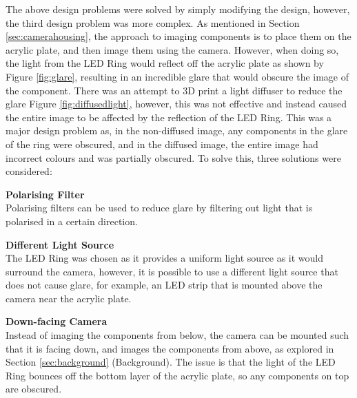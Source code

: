 The above design problems were solved by simply modifying the design, however, the third design problem was more complex. As mentioned in Section \ref{sec:camerahousing}, the approach 
to imaging components is to place them on the acrylic plate, and then image them using the camera. However, when doing so, the light from the LED Ring would reflect off the acrylic plate as shown by Figure \ref{fig:glare},
resulting in an incredible glare that would obscure the image of the component. There was an attempt to 3D print a light diffuser to reduce the glare Figure \ref{fig:diffusedlight}, however, this was not effective and instead
caused the entire image to be affected by the reflection of the LED Ring. This was a major design problem as, in the non-diffused image, any components in the glare of the ring were obscured, and in the diffused image,
the entire image had incorrect colours and was partially obscured. To solve this, three solutions were considered:
\begin{mylist}
  \item \textbf{Polarising Filter} \\
  Polarising filters can be used to reduce glare by filtering out light that is polarised in a certain direction.
  \item \textbf{Different Light Source} \\
  The LED Ring was chosen as it provides a uniform light source as it would surround the camera, however, it is possible to use a different light source that does not cause glare, for example,
  an LED strip that is mounted above the camera near the acrylic plate.
  \item \textbf{Down-facing Camera} \\
  Instead of imaging the components from below, the camera can be mounted such that it is facing down, and images the components from above, as explored in Section \ref{sec:background} (Background).
  The issue is that the light of the LED Ring bounces off the bottom layer of the acrylic plate, so any components on top are obscured.
\end{mylist}
  
